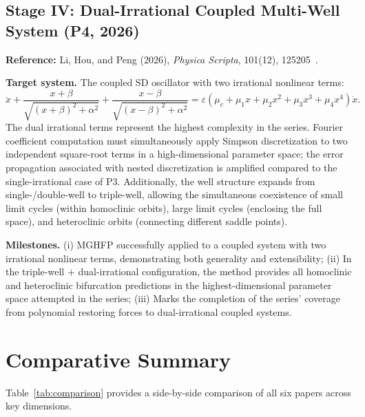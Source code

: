 \documentclass[11pt,a4paper]{article}
\begin{document}
\subsection{Stage IV: Dual-Irrational Coupled Multi-Well System (P4, 2026)}

\textbf{Reference:} Li, Hou, and Peng (2026), \textit{Physica Scripta}, 101(12), 125205~\cite{P4}.

\medskip
\noindent\textbf{Target system.} The coupled SD oscillator with two irrational nonlinear terms:
\begin{equation}
\ddot{x} + \frac{x+\beta}{\sqrt{(x+\beta)^2+\alpha^2}} + \frac{x-\beta}{\sqrt{(x-\beta)^2+\alpha^2}} = \varepsilon(\mu_c + \mu_1 x + \mu_2 x^2 + \mu_3 x^3 + \mu_4 x^4)\dot{x}.
\label{eq:P4}
\end{equation}
The dual irrational terms represent the highest complexity in the series. Fourier coefficient computation must simultaneously apply Simpson discretization to two independent square-root terms in a high-dimensional parameter space; the error propagation associated with nested discretization is amplified compared to the single-irrational case of P3. Additionally, the well structure expands from single-/double-well to triple-well, allowing the simultaneous coexistence of small limit cycles (within homoclinic orbits), large limit cycles (enclosing the full space), and heteroclinic orbits (connecting different saddle points).

\medskip
\noindent\textbf{Milestones.} (i) MGHFP successfully applied to a coupled system with two irrational nonlinear terms, demonstrating both generality and extensibility; (ii) In the triple-well $+$ dual-irrational configuration, the method provides all homoclinic and heteroclinic bifurcation predictions in the highest-dimensional parameter space attempted in the series; (iii) Marks the completion of the series' coverage from polynomial restoring forces to dual-irrational coupled systems.

\section{Comparative Summary}

Table~\ref{tab:comparison} provides a side-by-side comparison of all six papers across key dimensions.
\end{document}
